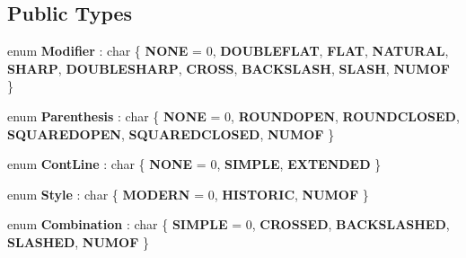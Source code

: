 \subsection*{Public Types}
\begin{DoxyCompactItemize}
\item 
\mbox{\label{class_ms_1_1_figured_bass_item_ab7376560f9cc3934377332c127aabb67}} 
enum {\bfseries Modifier} \+: char \{ \newline
{\bfseries N\+O\+NE} = 0, 
{\bfseries D\+O\+U\+B\+L\+E\+F\+L\+AT}, 
{\bfseries F\+L\+AT}, 
{\bfseries N\+A\+T\+U\+R\+AL}, 
\newline
{\bfseries S\+H\+A\+RP}, 
{\bfseries D\+O\+U\+B\+L\+E\+S\+H\+A\+RP}, 
{\bfseries C\+R\+O\+SS}, 
{\bfseries B\+A\+C\+K\+S\+L\+A\+SH}, 
\newline
{\bfseries S\+L\+A\+SH}, 
{\bfseries N\+U\+M\+OF}
 \}
\item 
\mbox{\label{class_ms_1_1_figured_bass_item_a793b442cab61ecc9b909d511ab81a959}} 
enum {\bfseries Parenthesis} \+: char \{ \newline
{\bfseries N\+O\+NE} = 0, 
{\bfseries R\+O\+U\+N\+D\+O\+P\+EN}, 
{\bfseries R\+O\+U\+N\+D\+C\+L\+O\+S\+ED}, 
{\bfseries S\+Q\+U\+A\+R\+E\+D\+O\+P\+EN}, 
\newline
{\bfseries S\+Q\+U\+A\+R\+E\+D\+C\+L\+O\+S\+ED}, 
{\bfseries N\+U\+M\+OF}
 \}
\item 
\mbox{\label{class_ms_1_1_figured_bass_item_ab8358782c80ca29d85e93d0a5cb1fa29}} 
enum {\bfseries Cont\+Line} \+: char \{ {\bfseries N\+O\+NE} = 0, 
{\bfseries S\+I\+M\+P\+LE}, 
{\bfseries E\+X\+T\+E\+N\+D\+ED}
 \}
\item 
\mbox{\label{class_ms_1_1_figured_bass_item_a54494fcac22dcb7b26a060bb4b8d7723}} 
enum {\bfseries Style} \+: char \{ {\bfseries M\+O\+D\+E\+RN} = 0, 
{\bfseries H\+I\+S\+T\+O\+R\+IC}, 
{\bfseries N\+U\+M\+OF}
 \}
\item 
\mbox{\label{class_ms_1_1_figured_bass_item_aaffc56f494cc0c508984816ba33586eb}} 
enum {\bfseries Combination} \+: char \{ \newline
{\bfseries S\+I\+M\+P\+LE} = 0, 
{\bfseries C\+R\+O\+S\+S\+ED}, 
{\bfseries B\+A\+C\+K\+S\+L\+A\+S\+H\+ED}, 
{\bfseries S\+L\+A\+S\+H\+ED}, 
\newline
{\bfseries N\+U\+M\+OF}
 \}
\end{DoxyCompactItemize}
